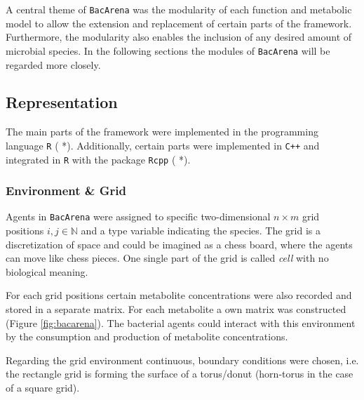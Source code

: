 A central theme of \texttt{BacArena} was the modularity of each function and metabolic model to allow the extension and replacement of certain parts of the framework. Furthermore, the modularity also enables the inclusion of any desired amount of microbial species. In the following sections the modules of \texttt{BacArena} will be regarded more closely. 

\subsection{Representation}
The main parts of the framework were implemented in the programming language \texttt{R} ( *). Additionally, certain parts were implemented in \texttt{C++} and integrated in \texttt{R} with the package \texttt{Rcpp} ( *).

\subsubsection{Environment \& Grid}
Agents in \texttt{BacArena} were assigned to specific two-dimensional $n \times m$ grid positions $i, j \in \mathbb{N}$ and a type variable indicating the species. The grid is a discretization of space and could be imagined as a chess board, where the agents can move like chess pieces. 
One single part of the grid is called \textit{cell} with no biological meaning.

For each grid positions certain metabolite concentrations were also recorded and stored in a separate matrix. For each metabolite a own matrix was constructed (Figure \hyperref[fig:bacarena]{\ref{fig:bacarena}}). The bacterial agents could interact with this environment by the consumption and production of metabolite concentrations.

Regarding the grid environment continuous, boundary conditions were chosen, i.e. the rectangle grid is forming the surface of a torus/donut (horn-torus in the case of a square grid).

